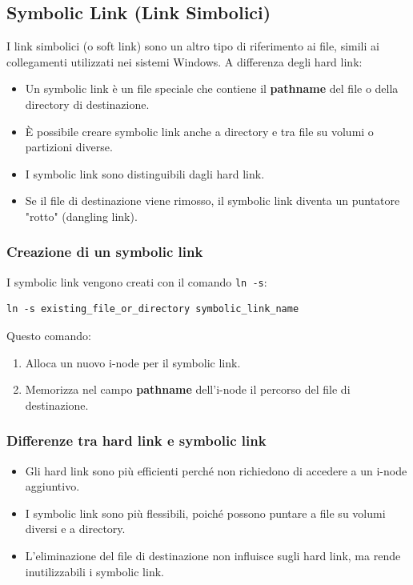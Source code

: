 \subsection{Symbolic Link (Link Simbolici)}
I link simbolici (o soft link) sono un altro tipo di riferimento ai file, simili ai collegamenti utilizzati nei sistemi Windows. A differenza degli hard link:
\begin{itemize}
    \item Un symbolic link è un file speciale che contiene il \textbf{pathname} del file o della directory di destinazione.
    \item È possibile creare symbolic link anche a directory e tra file su volumi o partizioni diverse.
    \item I symbolic link sono distinguibili dagli hard link.
    \item Se il file di destinazione viene rimosso, il symbolic link diventa un puntatore "rotto" (dangling link).
\end{itemize}

\subsubsection{Creazione di un symbolic link}
I symbolic link vengono creati con il comando \texttt{ln -s}:
\begin{verbatim}
ln -s existing_file_or_directory symbolic_link_name
\end{verbatim}
Questo comando:
\begin{enumerate}
    \item Alloca un nuovo i-node per il symbolic link.
    \item Memorizza nel campo \textbf{pathname} dell'i-node il percorso del file di destinazione.
\end{enumerate}

\subsubsection{Differenze tra hard link e symbolic link}
\begin{itemize}
    \item Gli hard link sono più efficienti perché non richiedono di accedere a un i-node aggiuntivo.
    \item I symbolic link sono più flessibili, poiché possono puntare a file su volumi diversi e a directory.
    \item L'eliminazione del file di destinazione non influisce sugli hard link, ma rende inutilizzabili i symbolic link.
\end{itemize}

